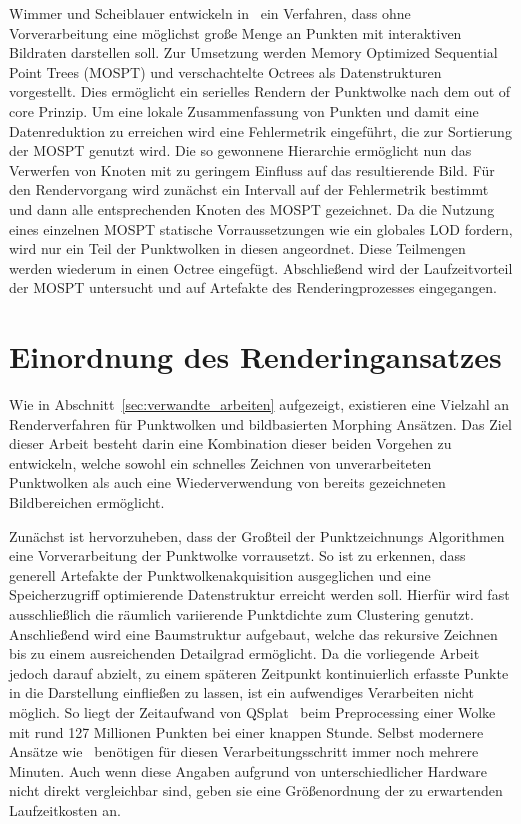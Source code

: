 \documentclass[hyperref, beleg, german]{cgvpub}
\begin{document}
Wimmer und Scheiblauer entwickeln in~\cite{wimmer2006instant} ein Verfahren,
dass ohne Vorverarbeitung eine möglichst große Menge an Punkten mit
interaktiven Bildraten darstellen soll. Zur Umsetzung werden Memory Optimized
Sequential Point Trees (MOSPT) und verschachtelte Octrees als Datenstrukturen
vorgestellt. Dies ermöglicht ein serielles Rendern der Punktwolke nach dem out
of core Prinzip. Um eine lokale Zusammenfassung von Punkten und damit eine
Datenreduktion zu erreichen wird eine Fehlermetrik eingeführt, die zur
Sortierung der MOSPT genutzt wird. Die so gewonnene Hierarchie ermöglicht nun
das Verwerfen von Knoten mit zu geringem Einfluss auf das resultierende Bild.
Für den Rendervorgang wird zunächst ein Intervall auf der Fehlermetrik bestimmt
und dann alle entsprechenden Knoten des MOSPT gezeichnet. Da die Nutzung eines
einzelnen MOSPT statische Vorraussetzungen wie ein globales LOD fordern, wird
nur ein Teil der Punktwolken in diesen angeordnet. Diese Teilmengen werden
wiederum in einen Octree eingefügt. Abschließend wird der Laufzeitvorteil der
MOSPT untersucht und auf Artefakte des Renderingprozesses eingegangen.

\section{Einordnung des Renderingansatzes}

Wie in Abschnitt~\ref{sec:verwandte_arbeiten} aufgezeigt, existieren eine
Vielzahl an Renderverfahren für Punktwolken und bildbasierten Morphing
Ansätzen. Das Ziel dieser Arbeit besteht darin eine Kombination dieser beiden
Vorgehen zu entwickeln, welche sowohl ein schnelles Zeichnen von
unverarbeiteten Punktwolken als auch eine Wiederverwendung von bereits
gezeichneten Bildbereichen ermöglicht.

Zunächst ist hervorzuheben, dass der Großteil der Punktzeichnungs Algorithmen
eine Vorverarbeitung der Punktwolke vorrausetzt. So ist zu erkennen, dass
generell Artefakte der Punktwolkenakquisition ausgeglichen und eine
Speicherzugriff optimierende Datenstruktur erreicht werden soll. Hierfür wird
fast ausschließlich die räumlich variierende Punktdichte zum Clustering
genutzt. Anschließend wird eine Baumstruktur aufgebaut, welche das rekursive
Zeichnen bis zu einem ausreichenden Detailgrad ermöglicht. Da die vorliegende
Arbeit jedoch darauf abzielt, zu einem späteren Zeitpunkt kontinuierlich
erfasste Punkte in die Darstellung einfließen zu lassen, ist ein aufwendiges
Verarbeiten nicht möglich. So liegt der Zeitaufwand von
QSplat~\cite{rusinkiewicz2000qsplat} beim Preprocessing einer Wolke mit rund
127 Millionen Punkten bei einer knappen Stunde. Selbst modernere Ansätze
wie~\cite{goswami2010high} benötigen für diesen Verarbeitungsschritt immer noch
mehrere Minuten. Auch wenn diese Angaben aufgrund von unterschiedlicher
Hardware nicht direkt vergleichbar sind, geben sie eine Größenordnung der zu
erwartenden Laufzeitkosten an.
\end{document}
